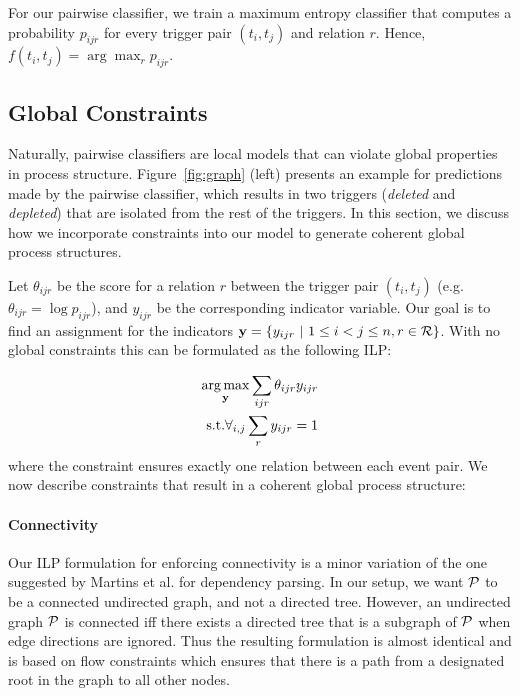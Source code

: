 For our pairwise classifier, we train a maximum entropy classifier that computes a probability $p_{ijr}$ for every trigger pair $(t_i,t_j)$ and relation $r$. Hence, $f(t_i,t_j)= \arg\max_r p_{ijr}$.

\subsection{Global Constraints} \label{subsec:global}
Naturally, pairwise classifiers are local models that can violate global properties in process structure. Figure~\ref{fig:graph} (left) presents an example for predictions made by the pairwise classifier, which results in two triggers (\emph{deleted} and \emph{depleted}) that are isolated from the rest of the triggers. In this section, we discuss how we incorporate constraints into our model to generate coherent global process structures.

Let $\theta_{ijr}$ be the score for a relation $r$ between the trigger pair $(t_i,t_j)$ (e.g. $\theta_{ijr}=\log p_{ijr}$), and $y_{ijr}$ be the corresponding indicator variable. Our goal is to find an assignment for the indicators $\by=\{y_{ijr} \ | \ 1 \leq i < j \leq n, r \in \sR \}$. With no global constraints this can be formulated as the following ILP:

\begin{align}
\vspace{-3mm}
\argmax_{\by} \sum_{ijr} \theta_{ijr} y_{ijr} \\
\mbox{s.t.} \forall_{i,j} \sum_r y_{ijr}=1 \nonumber
\vspace{-3mm}
\end{align}
\noindent where the constraint ensures exactly one relation between each event pair. We now describe constraints that result in a coherent global process structure:

\paragraph{Connectivity} 
Our ILP formulation for enforcing connectivity is a minor variation of the one suggested by Martins et al.  for dependency parsing. In our setup, we want $\mathcal{P}$ to be a connected undirected graph, and not a directed tree. However, an undirected graph $\mathcal{P}$ is connected iff there exists a directed tree that is a subgraph of $\mathcal{P}$ when edge directions are ignored. Thus the resulting formulation is almost identical and is based on flow constraints which ensures that there is a path from a designated root in the graph to all other nodes.

